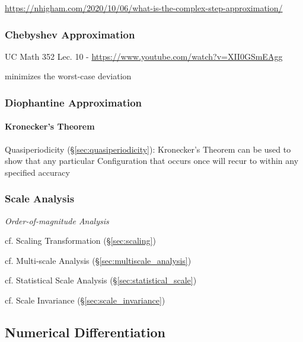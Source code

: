 {\url{https://nhigham.com/2020/10/06/what-is-the-complex-step-approximation/}



\subsubsection{Chebyshev Approximation}\label{sec:chebyshev_approximation}

UC Math 352 Lec. 10 - \url{https://www.youtube.com/watch?v=XII0GSmEAgg}

minimizes the worst-case deviation



\subsubsection{Diophantine Approximation}\label{sec:diophantine_approximation}

\paragraph{Kronecker's Theorem}\label{sec:kroneckers_theorem}\hfill

Quasiperiodicity (\S\ref{sec:quasiperiodicity}): Kronecker's Theorem can be used
to show that any particular Configuration that occurs once will recur to within
any specified accuracy



\subsubsection{Scale Analysis}\label{sec:scale_analysis}

\emph{Order-of-magnitude Analysis}

cf. Scaling Transformation (\S\ref{sec:scaling})

cf. Multi-scale Analysis (\S\ref{sec:multiscale_analysis})

cf. Statistical Scale Analysis (\S\ref{sec:statistical_scale})

cf. Scale Invariance (\S\ref{sec:scale_invariance})



\subsection{Numerical Differentiation}\label{sec:numerical_differentiation}

}
